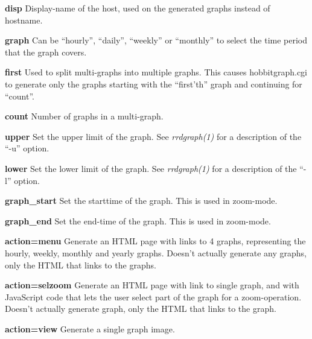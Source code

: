  \textbf{disp}
 Display-name of the host, used on the generated graphs instead of hostname. 


 \textbf{graph}
 Can be ``hourly'', ``daily'', ``weekly'' or ``monthly'' to select the time period that the graph covers. 


 \textbf{first}
 Used to split multi-graphs into multiple graphs. This causes
 hobbitgraph.cgi to generate only the graphs starting with the
 ``first'th'' graph and continuing for ``count''. 


 \textbf{count}
 Number of graphs in a multi-graph. 


 \textbf{upper}
 Set the upper limit of the graph. See \emph{rrdgraph(1)}
 for a description of the ``-u'' option. 


 \textbf{lower}
 Set the lower limit of the graph. See \emph{rrdgraph(1)}
 for a description of the ``-l'' option. 


 \textbf{graph\_start}
 Set the starttime of the graph. This is used in zoom-mode. 


 \textbf{graph\_end}
 Set the end-time of the graph. This is used in zoom-mode. 


 \textbf{action=menu}
 Generate an HTML page with links to 4 graphs, representing the hourly, weekly, monthly and yearly graphs. Doesn't actually generate any graphs, only the HTML that links to the graphs. 


 \textbf{action=selzoom}
 Generate an HTML page with link to single graph, and with JavaScript code that lets the user select part of the graph for a zoom-operation. Doesn't actually generate graph, only the HTML that links to the graph. 


 \textbf{action=view}
 Generate a single graph image. 


 
